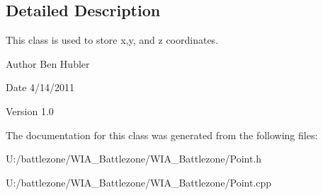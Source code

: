 \subsection{Detailed Description}
This class is used to store x,y, and z coordinates. 

\begin{DoxyAuthor}{Author}
Ben Hubler
\end{DoxyAuthor}
\begin{DoxyDate}{Date}
4/14/2011 
\end{DoxyDate}
\begin{DoxyVersion}{Version}
1.0 
\end{DoxyVersion}


The documentation for this class was generated from the following files:\begin{DoxyCompactItemize}
\item 
U:/battlezone/WIA\_\-Battlezone/WIA\_\-Battlezone/Point.h\item 
U:/battlezone/WIA\_\-Battlezone/WIA\_\-Battlezone/Point.cpp\end{DoxyCompactItemize}

